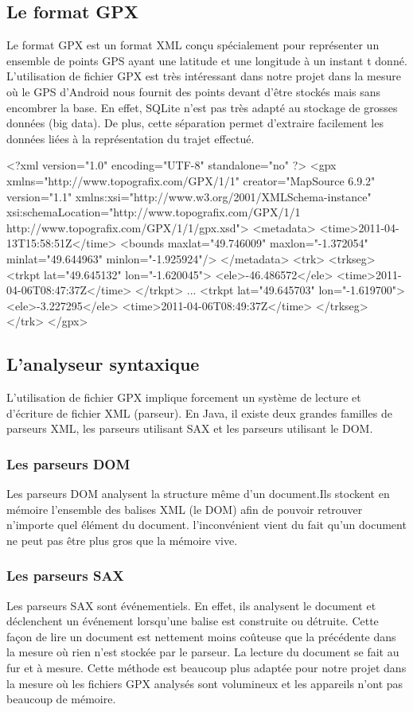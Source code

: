 \subsection{Le format GPX}
Le format GPX est un format XML conçu spécialement pour représenter un ensemble de points GPS ayant une latitude et une longitude à un instant t donné. L'utilisation de fichier GPX est très intéressant dans notre projet dans la mesure où le GPS d'Android nous fournit des points devant d'être stockés mais sans encombrer la base. En effet, SQLite n'est pas très adapté au stockage de grosses données (big data). De plus, cette séparation permet d'extraire facilement les données liées à la représentation du trajet effectué.

\begin{xml}
<?xml version="1.0" encoding="UTF-8" standalone="no" ?>
<gpx xmlns="http://www.topografix.com/GPX/1/1" creator="MapSource 6.9.2" version="1.1" xmlns:xsi="http://www.w3.org/2001/XMLSchema-instance" xsi:schemaLocation="http://www.topografix.com/GPX/1/1 http://www.topografix.com/GPX/1/1/gpx.xsd">
  <metadata>
    <time>2011-04-13T15:58:51Z</time>
    <bounds maxlat="49.746009" maxlon="-1.372054" minlat="49.644963" minlon="-1.925924"/>
  </metadata>
  <trk>
    <trkseg>
      <trkpt lat="49.645132" lon="-1.620045">
        <ele>-46.486572</ele>
        <time>2011-04-06T08:47:37Z</time>
      </trkpt>
     ...
      <trkpt lat="49.645703" lon="-1.619700">
        <ele>-3.227295</ele>
        <time>2011-04-06T08:49:37Z</time>
    </trkseg>
  </trk>
</gpx>
\end{xml}

\subsection{L'analyseur syntaxique}
L'utilisation de fichier GPX implique forcement un système de lecture et d'écriture de fichier XML (parseur). En Java, il existe deux grandes familles de parseurs XML, les parseurs utilisant SAX et les parseurs utilisant le DOM.

\subsubsection{Les parseurs DOM}
Les parseurs DOM analysent la structure même d'un document.Ils stockent en mémoire l'ensemble des balises XML (le DOM) afin de pouvoir retrouver n'importe quel élément du document. l'inconvénient vient du fait qu'un document ne peut pas être plus gros que la mémoire vive. 

\subsubsection{Les parseurs SAX}
Les parseurs SAX sont événementiels. En effet, ils analysent le document et déclenchent un événement lorsqu'une balise est construite ou détruite. Cette façon de lire un document est nettement moins coûteuse que la précédente dans la mesure où rien n'est stockée par le parseur. La lecture du document se fait au fur et à mesure. Cette méthode est beaucoup plus adaptée pour notre projet dans la mesure où les fichiers GPX analysés sont volumineux et les appareils n'ont pas beaucoup de mémoire. 